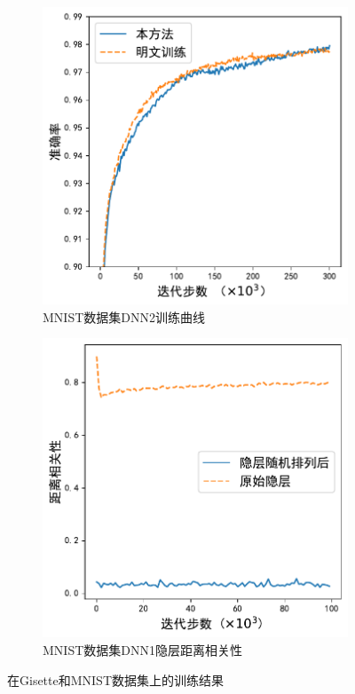 \begin{figure}[h!]
    \begin{subfigure}[b]{0.47\linewidth}
    \centering
    \includegraphics[width=\linewidth]{Z_Resources/ss-perm_dnn2.pdf}
    \caption{MNIST数据集DNN2训练曲线}
    \end{subfigure}
    \begin{subfigure}[b]{0.47\linewidth}
    \centering
    \includegraphics[width=\linewidth]{Z_Resources/ss-perm_dnn1-dcor.pdf}
    \caption{MNIST数据集DNN1隐层距离相关性}
    \end{subfigure}
\caption{在Gisette和MNIST数据集上的训练结果}
\label{fig:ss-perm:train}
\end{figure}

